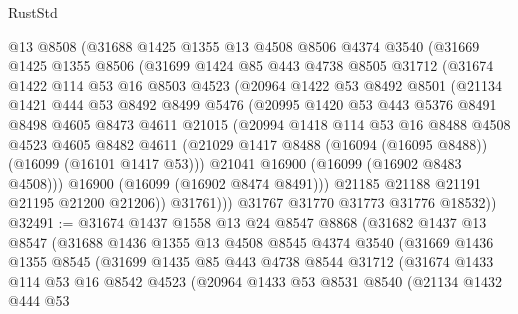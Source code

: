 \begin{lexlean}{RustStd}
\begin{coremodule}
      @13
      @8508
      (@31688
        @1425
        @1355
        @13
        @4508
        @8506
        @4374
        @3540
        (@31669
          @1425
          @1355
          @8506
          (@31699
            @1424
            @85
            @443
            @4738
            @8505
            @31712
            (@31674
              @1422
              @114
              @53
              @16
              @8503
              @4523
              (@20964
                @1422
                @53
                @8492
                @8501
                (@21134
                  @1421
                  @444
                  @53
                  @8492
                  @8499
                  @5476
                  (@20995
                    @1420
                    @53
                    @443
                    @5376
                    @8491
                    @8498
                    @4605
                    @8473
                    @4611
                    @21015
                    (@20994
                      @1418
                      @114
                      @53
                      @16
                      @8488
                      @4508
                      @4523
                      @4605
                      @8482
                      @4611
                      (@21029 @1417 @8488 (@16094 (@16095 @8488)) (@16099 (@16101 @1417 @53)))
                      @21041
                      @16900
                      (@16099 (@16902 @8483 @4508)))
                    @16900
                    (@16099 (@16902 @8474 @8491)))
                  @21185
                  @21188
                  @21191
                  @21195
                  @21200
                  @21206))
              @31761)))
        @31767
        @31770
        @31773
        @31776
        @18532))
@32491 := @31674
    @1437
    @1558
    @13
    @24
    @8547
    @8868
    (@31682
      @1437
      @13
      @8547
      (@31688
        @1436
        @1355
        @13
        @4508
        @8545
        @4374
        @3540
        (@31669
          @1436
          @1355
          @8545
          (@31699
            @1435
            @85
            @443
            @4738
            @8544
            @31712
            (@31674
              @1433
              @114
              @53
              @16
              @8542
              @4523
              (@20964
                @1433
                @53
                @8531
                @8540
                (@21134
                  @1432
                  @444
                  @53

\end{coremodule}
\end{lexlean}
